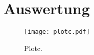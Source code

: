 \section{Auswertung}
\label{sec:Auswertung}

\begin{figure}
  \centering
  \texttt{[image: plotc.pdf]}
  \caption{Plotc.}
  \label{fig:plotc}
\end{figure}
